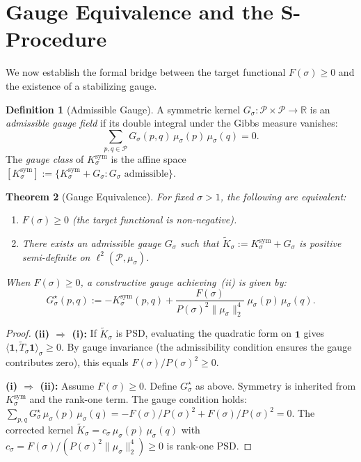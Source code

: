 \documentclass[12pt,a4paper]{article}
\newtheorem{theorem}{Theorem}[section]
\theoremstyle{definition}
\newtheorem{definition}[theorem]{Definition}
\theoremstyle{remark}
\newcommand{\Ksym}{K_\sigma^{\mathrm{sym}}}
\newcommand{\muG}{\mu_\sigma}
\begin{document}
\section{Gauge Equivalence and the S-Procedure}

We now establish the formal bridge between the target functional $F(\sigma) \ge 0$ and the existence of a stabilizing gauge.

\begin{definition}[Admissible Gauge]\label{def:gauge}
A symmetric kernel $G_\sigma: \mathcal{P} \times \mathcal{P} \to \mathbb{R}$ is an \emph{admissible gauge field} if its double integral under the Gibbs measure vanishes:
\[ \sum_{p,q \in \mathcal{P}} G_\sigma(p,q)\,\muG(p)\,\muG(q) = 0. \]
The \emph{gauge class} of $\Ksym$ is the affine space $[\Ksym] := \{ \Ksym + G_\sigma : G_\sigma \text{ admissible}\}$.
\end{definition}

\begin{theorem}[Gauge Equivalence]\label{thm:gauge-equiv}
For fixed $\sigma > 1$, the following are equivalent:
\begin{enumerate}[label=(\roman*)]
  \item $F(\sigma) \ge 0$ \quad (the target functional is non-negative).
  \item There exists an admissible gauge $G_\sigma$ such that $\widetilde{K}_\sigma := \Ksym + G_\sigma$ is positive semi-definite on $\ell^2(\mathcal{P}, \muG)$.
\end{enumerate}
When $F(\sigma) \ge 0$, a constructive gauge achieving~(ii) is given by:
\[ G_\sigma^{\star}(p,q) := -\Ksym(p,q) + \frac{F(\sigma)}{P(\sigma)^2 \|\muG\|_2^4}\;\muG(p)\,\muG(q). \]
\end{theorem}
\begin{proof}
\textbf{(ii) $\Rightarrow$ (i):} If $\widetilde{K}_\sigma$ is PSD, evaluating the quadratic form on $\mathbf{1}$ gives $\langle \mathbf{1}, \widetilde{T}_\sigma \mathbf{1} \rangle_\sigma \ge 0$. By gauge invariance (the admissibility condition ensures the gauge contributes zero), this equals $F(\sigma)/P(\sigma)^2 \ge 0$.

\textbf{(i) $\Rightarrow$ (ii):} Assume $F(\sigma) \ge 0$. Define $G_\sigma^{\star}$ as above. Symmetry is inherited from $\Ksym$ and the rank-one term. The gauge condition holds: $\sum_{p,q} G_\sigma^{\star}\,\muG(p)\,\muG(q) = -F(\sigma)/P(\sigma)^2 + F(\sigma)/P(\sigma)^2 = 0$. The corrected kernel $\widetilde{K}_\sigma = c_\sigma\,\muG(p)\,\muG(q)$ with $c_\sigma = F(\sigma)/(P(\sigma)^2\|\muG\|_2^4) \ge 0$ is rank-one PSD.
\end{proof}
\end{document}
